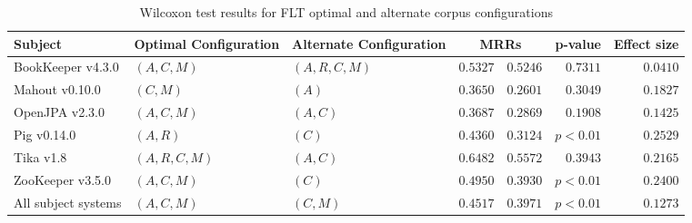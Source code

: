 \begin{landscape}

\begin{table}
\begin{spacing}{1.2}
\centering
\caption{Wilcoxon test results for FLT optimal and alternate corpus configurations}
\label{table:combo-flt-corpus-sweep-wilcox}
\begin{tabular}{lllrrrr}
\toprule
                      Subject & Optimal Configuration & Alternate Configuration & \multicolumn{2}{c}{MRRs}  &  p-value & Effect size \\
\midrule
            BookKeeper v4.3.0 &           $(A, C, M)$ &          $(A, R, C, M)$ &    $0.5327$ &      $0.5246$ & $0.7311$ &    $0.0410$ \\
               Mahout v0.10.0 &              $(C, M)$ &                   $(A)$ &    $0.3650$ &      $0.2601$ & $0.3049$ &    $0.1827$ \\
               OpenJPA v2.3.0 &           $(A, C, M)$ &                $(A, C)$ &    $0.3687$ &      $0.2869$ & $0.1908$ &    $0.1425$ \\
                  Pig v0.14.0 &              $(A, R)$ &                   $(C)$ &    $0.4360$ &      $0.3124$ & $p<0.01$ &    $0.2529$ \\
                    Tika v1.8 &        $(A, R, C, M)$ &                $(A, C)$ &    $0.6482$ &      $0.5572$ & $0.3943$ &    $0.2165$ \\
             ZooKeeper v3.5.0 &           $(A, C, M)$ &                   $(C)$ &    $0.4950$ &      $0.3930$ & $p<0.01$ &    $0.2400$ \\
 \midrule
All subject systems &           $(A, C, M)$ &                $(C, M)$ &    $0.4517$ &      $0.3971$ & $p<0.01$ &    $0.1273$ \\
\bottomrule
\end{tabular}

\end{spacing}
\end{table}



\end{landscape}
